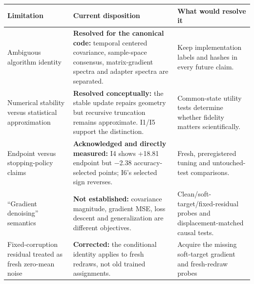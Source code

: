 \documentclass[
  british,
  10pt,
  a4paper,
]{article}
\newcounter{none} %
\begin{document}
{\def\LTcaptype{none} %
\begin{longtable}[]{@{}
  >{\raggedright\arraybackslash}p{}
  >{\raggedright\arraybackslash}p{}
  >{\raggedright\arraybackslash}p{}@{}}
\toprule\noalign{}
\begin{minipage}[b]{\linewidth}\raggedright
Limitation
\end{minipage} & \begin{minipage}[b]{\linewidth}\raggedright
Current disposition
\end{minipage} & \begin{minipage}[b]{\linewidth}\raggedright
What would resolve it
\end{minipage} \\
\midrule\noalign{}
\endhead
\bottomrule\noalign{}
\endlastfoot
Ambiguous algorithm identity & \textbf{Resolved for the canonical code:}
temporal centered covariance,\allowbreak{} sample-\allowbreak{}space
consensus, matrix-\allowbreak{}gradient spectra and adapter spectra are
separated. & Keep implementation labels and hashes in every future
claim. \\
Numerical stability versus statistical approximation & \textbf{Resolved
conceptually:} the stable update repairs geometry but recursive
truncation remains approximate.\allowbreak{} I1/I5 support the
distinction.\allowbreak{} & Common-\allowbreak{}state utility tests
determine whether fidelity matters
scientifical\allowbreak{}ly.\allowbreak{} \\
Endpoint versus stopping-\allowbreak{}policy claims &
\textbf{Acknowledged and directly measured:} I4 shows +18.81 endpoint
but −2.38 accuracy-\allowbreak{}selected points; I6's selected sign
reverses. & Fresh, preregistered tuning and untouched-\allowbreak{}test
comparisons.\allowbreak{} \\
``Gradient denoising'' semantics & \textbf{Not established:} covariance
magnitude, gradient MSE, loss descent and generalization are different
objectives.\allowbreak{} &
Clean/\allowbreak{}soft-\allowbreak{}target/\allowbreak{}fixed-\allowbreak{}residual
probes and displacement\allowbreak{}-\allowbreak{}matched causal
tests. \\
Fixed-\allowbreak{}corruption residual treated as fresh zero-mean noise
& \textbf{Corrected:} the conditional identity applies to fresh redraws,
not old trained assignments.\allowbreak{} & Acquire the missing
soft-\allowbreak{}target gradient and fresh-\allowbreak{}redraw probes

\end{longtable}}
\end{document}
